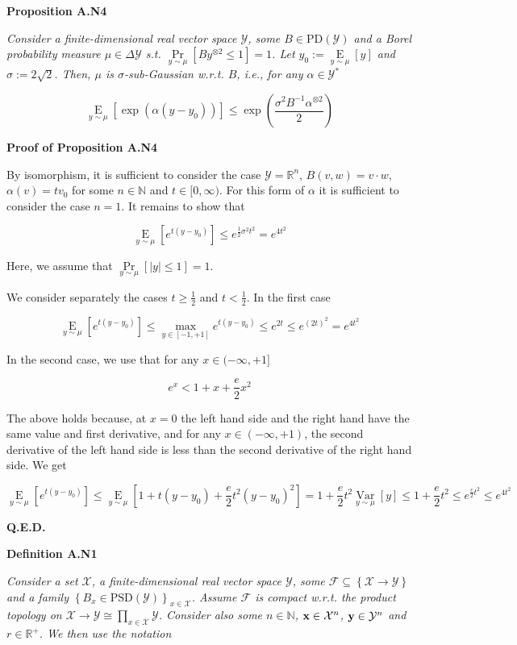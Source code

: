 \documentclass[a4paper]{article}
\newcommand{\Co}[1]{}
\newcommand{\AP}[1]{\left(#1\right)}
\newcommand{\AB}[1]{\left[#1\right]}
\newcommand{\AC}[1]{\left\{#1\right\}}
\newcommand{\Pa}[2]{\underset{#1}{\operatorname{Pr}}\AB{#2}}
\newcommand{\Ea}[2]{\underset{#1}{\operatorname{E}}\AB{#2}}
\newcommand{\Var}[2]{\underset{#1}{\operatorname{Var}}\AB{#2}}
\newcommand{\Nats}{\mathbb{N}}
\newcommand{\Reals}{\mathbb{R}}
\newcommand{\PD}{\mathrm{PD}}
\newcommand{\PSD}{\mathrm{PSD}}
\newcommand{\Abs}[1]{\left\vert #1 \right\vert}
\newcommand{\B}{B}
\newcommand{\X}{\mathcal{X}}
\newcommand{\Y}{\mathcal{Y}}
\newcommand{\F}{\mathcal{F}}
\begin{document}
\textbf{Proposition A.N4}\Co{b}

\textit{Consider a finite-dimensional real vector space $\Y$, some $\B \in\PD(\Y)$ and a Borel probability measure $\mu\in\Delta\Y$ s.t. $\Pa{y\sim\mu}{\B y^{\otimes 2} \leq 1} = 1$. Let $y_0:=\Ea{y\sim\mu}{y}$ and $\sigma:=2\sqrt{2}$. Then, $\mu$ is $\sigma$-sub-Gaussian w.r.t. $\B $, i.e., for any $\alpha\in\Y^*$}\Co{i}

$$\Ea{y\sim\mu}{\exp\AP{\alpha\AP{y-y_0}}} \leq \exp\AP{\frac{\sigma^2\B ^{-1}\alpha^{\otimes 2}}{2}}$$

\textbf{Proof of Proposition A.N4}\Co{b}

By isomorphism, it is sufficient to consider the case $\Y=\Reals^n$, $B(v,w)=v\cdot w$, $\alpha(v)=tv_0$ for some $n\in\Nats$ and $t\in[0,\infty)$. For this form of $\alpha$ it is sufficient to consider the case $n=1$. It remains to show that

$$\Ea{y\sim\mu}{e^{t\AP{y-y_0}}}\leq e^{\frac{1}{2}\sigma^2t^2}=e^{4t^2}$$

Here, we assume that $\Pa{y\sim\mu}{\Abs{y}\leq1}=1$.

We consider separately the cases $t\geq\frac{1}{2}$ and $t<\frac{1}{2}$. In the first case

$$\Ea{y\sim\mu}{e^{t\AP{y-y_0}}}\leq \max_{y\in[-1,+1]}{e^{t(y-y_0)}} \leq e^{2t}\leq e^{(2t)^2}=e^{4t^2}$$

In the second case, we use that for any $x\in(-\infty,+1]$

$$e^x<1+x+\frac{e}{2}x^2$$

The above holds because, at $x=0$ the left hand side and the right hand have the same value and first derivative, and for any $x\in(-\infty,+1)$, the second derivative of the left hand side is less than the second derivative of the right hand side. We get

$$\Ea{y\sim\mu}{e^{t\AP{y-y_0}}}\leq\Ea{y\sim\mu}{1+t\AP{y-y_0}+\frac{e}{2}t^2\AP{y-y_0}^2}=1+\frac{e}{2}t^2\Var{y\sim\mu}{y}\leq1+\frac{e}{2}t^2\leq e^{\frac{e}{2}t^2}\leq e^{4t^2}$$

\textbf{Q.E.D.}\Co{b}

\textbf{Definition A.N1}\Co{b}

\textit{Consider a set $\X$, a finite-dimensional real vector space $\Y$, some $\F\subseteq\AC{\X\rightarrow\Y}$ and a family $\AC{\B _x\in\PSD(\Y)}_{x\in\X}$. Assume $\F$ is compact w.r.t. the product topology on $\X\rightarrow\Y\cong\prod_{x\in\X}\Y$. Consider also some $n\in\Nats$, $\bold{x}\in\X^n$, $\bold{y}\in\Y^n$ and $r\in\Reals^+$. We then use the notation}\Co{i}
\end{document}
